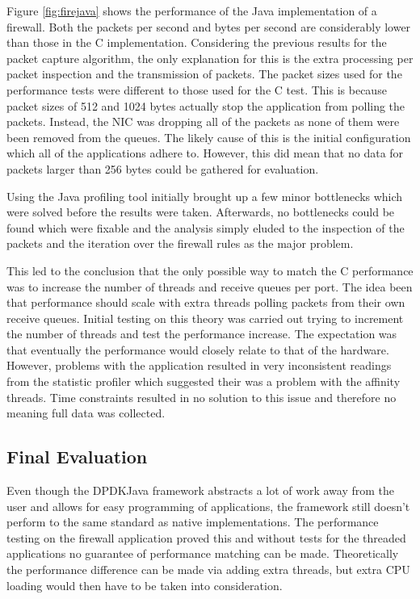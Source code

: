 \documentclass[final_report.tex]{subfiles}
\begin{document}
Figure \ref{fig:firejava} shows the performance of the Java implementation of a firewall. Both the packets per second and bytes per second are considerably lower than those in the C implementation. Considering the previous results for the packet capture algorithm, the only explanation for this is the extra processing per packet inspection and the transmission of packets. The packet sizes used for the performance tests were different to those used for the C test. This is because packet sizes of 512 and 1024 bytes actually stop the application from polling the packets. Instead, the NIC was dropping all of the packets as none of them were been removed from the queues. The likely cause of this is the initial configuration which all of the applications adhere to. However, this did mean that no data for packets larger than 256 bytes could be gathered for evaluation.

Using the Java profiling tool initially brought up a few minor bottlenecks which were solved before the results were taken. Afterwards, no bottlenecks could be found which were fixable and the analysis simply eluded to the inspection of the packets and the iteration over the firewall rules as the major problem.

This led to the conclusion that the only possible way to match the C performance was to increase the number of threads and receive queues per port. The idea been that performance should scale with extra threads polling packets from their own receive queues. Initial testing on this theory was carried out trying to increment the number of threads and test the performance increase. The expectation was that eventually the performance would closely relate to that of the hardware. However, problems with the application resulted in very inconsistent readings from the statistic profiler which suggested their was a problem with the affinity threads. 
Time constraints resulted in no solution to this issue and therefore no meaning full data was collected.

\subsection{Final Evaluation}
Even though the DPDKJava framework abstracts a lot of work away from the user and allows for easy programming of applications, the framework still doesn't perform to the same standard as native implementations. The performance testing on the firewall application proved this and without tests for the threaded applications no guarantee of performance matching can be made. Theoretically the performance difference can be made via adding extra threads, but extra CPU loading would then have to be taken into consideration.
\end{document}
